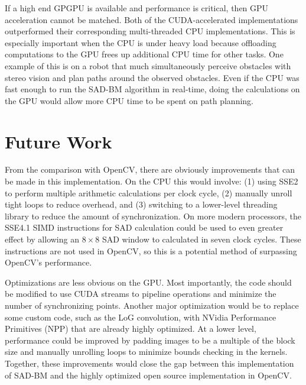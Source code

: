 \documentclass{article}
\begin{document}
If a high end GPGPU is available and performance is critical, then GPU
acceleration cannot be matched. Both of the CUDA-accelerated implementations
outperformed their corresponding multi-threaded CPU implementations. This is
especially important when the CPU is under heavy load because offloading
computations to the GPU frees up additional CPU time for other tasks. One
example of this is on a robot that much simultaneously perceive obstacles with
stereo vision and plan paths around the observed obstacles. Even if the CPU was
fast enough to run the SAD-BM algorithm in real-time, doing the calculations on
the GPU would allow more CPU time to be spent on path planning.

\section{Future Work}
\label{sec:future}
From the comparison with OpenCV, there are obviously improvements that can be
made in this implementation. On the CPU this would involve: (1) using SSE2 to
perform multiple arithmetic calculations per clock cycle, (2) manually unroll
tight loops to reduce overhead, and (3) switching to a lower-level threading
library to reduce the amount of synchronization. On more modern processors, the
SSE4.1 SIMD instructions for SAD calculation could be used to even greater
effect by allowing an $8 \times 8$ SAD window to calculated in seven clock
cycles. These instructions are not used in OpenCV, so this is a potential
method of surpassing OpenCV's performance.

Optimizations are less obvious on the GPU. Most importantly, the code should be
modified to use CUDA streams to pipeline operations and minimize the number of
synchronizing points. Another major optimization would be to replace some
custom code, such as the LoG convolution, with NVidia Performance Primitives
(NPP) that are already highly optimized. At a lower level, performance could be
improved by padding images to be a multiple of the block size and manually
unrolling loops to minimize bounds checking in the kernels. Together, these
improvements would close the gap between this implementation of SAD-BM and the
highly optimized open source implementation in OpenCV.
\end{document}
